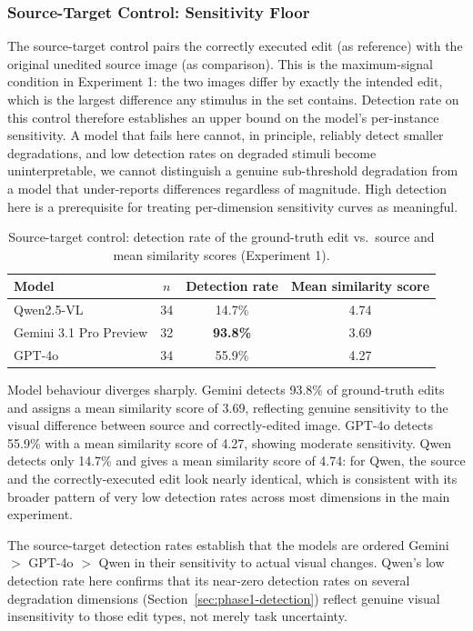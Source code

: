 \subsubsection{Source-Target Control: Sensitivity Floor}

The source-target control pairs the correctly executed edit (as reference) with the original unedited source image (as comparison). This is the maximum-signal condition in Experiment 1: the two images differ by exactly the intended edit, which is the largest difference any stimulus in the set contains. Detection rate on this control therefore establishes an upper bound on the model's per-instance sensitivity. A model that fails here cannot, in principle, reliably detect smaller degradations, and low detection rates on degraded stimuli become uninterpretable, we cannot distinguish a genuine sub-threshold degradation from a model that under-reports differences regardless of magnitude. High detection here is a prerequisite for treating per-dimension sensitivity curves as meaningful.

\begin{table}[htbp]
\centering
\caption{Source-target control: detection rate of the ground-truth edit vs.\ source and mean similarity scores (Experiment 1).}
\label{tab:source-target-control}
\begin{tabular}{lccc}
\toprule
Model & $n$ & Detection rate & Mean similarity score \\
\midrule
Qwen2.5-VL              & 34 & 14.7\%          & 4.74 \\
Gemini 3.1 Pro Preview  & 32 & \textbf{93.8\%} & 3.69 \\
GPT-4o                  & 34 & 55.9\%          & 4.27 \\
\bottomrule
\end{tabular}
\end{table}

Model behaviour diverges sharply. Gemini detects 93.8\% of ground-truth edits and assigns a mean similarity score of 3.69, reflecting genuine sensitivity to the visual difference between source and correctly-edited image. GPT-4o detects 55.9\% with a mean similarity score of 4.27, showing moderate sensitivity. Qwen detects only 14.7\% and gives a mean similarity score of 4.74: for Qwen, the source and the correctly-executed edit look nearly identical, which is consistent with its broader pattern of very low detection rates across most dimensions in the main experiment.

The source-target detection rates establish that the models are ordered Gemini $>$ GPT-4o $>$ Qwen in their sensitivity to actual visual changes. Qwen's low detection rate here confirms that its near-zero detection rates on several degradation dimensions (Section~\ref{sec:phase1-detection}) reflect genuine visual insensitivity to those edit types, not merely task uncertainty.

